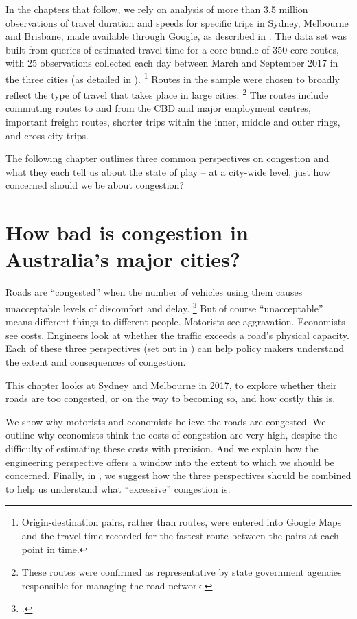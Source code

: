 \documentclass{grattan}
\begin{document}
In the chapters that follow, we rely on analysis of more than 3.5 million observations of travel duration and speeds for specific trips in Sydney, Melbourne and Brisbane, made available through Google, as described in .
The data set was built from queries of estimated travel time for a core bundle of 350 core routes, with 25 observations collected each day between March and September 2017 in the three cities (as detailed in ).%
    \footnote{Origin-destination pairs, rather than routes, were entered into Google Maps and the travel time recorded for the fastest route between the pairs at each point in time.}
Routes in the sample were chosen to broadly reflect the type of travel that takes place in large cities.%
    \footnote{These routes were confirmed as representative by state government agencies responsible for managing the road network.}
The routes include commuting routes to and from the CBD and major employment centres, important freight routes, shorter trips within the inner, middle and outer rings, and cross-city trips.

The following chapter outlines three common perspectives on congestion and what they each tell us about the state of play -- at a city-wide level, just how concerned should we be about congestion?





\chapter{How bad is congestion in Australia's major cities?}\label{chap:state-of-play-Australia}

Roads are ``congested'' when the number of vehicles using them causes unacceptable levels of discomfort and delay.%
    \footcite[][93]{Falcocchio-and-Levinson-congestion-a-concise-guide}
But of course ``unacceptable'' means different things to different people. Motorists see aggravation. Economists see costs. Engineers look at whether the traffic exceeds a road's physical capacity. Each of these three perspectives (set out in ) can help policy makers understand the extent and consequences of congestion.

This chapter looks at Sydney and Melbourne in 2017, to explore whether their roads are too congested, or on the way to becoming so, and how costly this is.

We show why motorists and economists believe the roads are congested. We outline why economists think the costs of congestion are very high, despite the difficulty of estimating these costs with precision. And we explain how the engineering perspective offers a window into the extent to which we should be concerned. Finally, in , we suggest how the three perspectives should be combined to help us understand what ``excessive'' congestion is.
\end{document}
